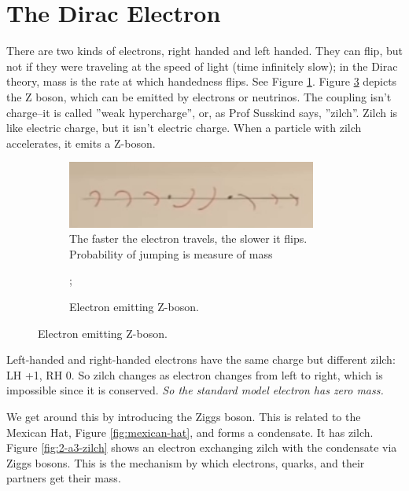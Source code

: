 \documentclass[]{article}
\begin{document}
\section{The Dirac Electron}

There are two kinds of electrons, right handed and left handed. They can flip, but not if they were traveling at the speed of light (time infinitely slow); in the Dirac theory, mass is the rate at which handedness flips. See Figure \ref{fig:2-a3-flipping-electron}. Figure \ref{fig:2-a3-Z-boson} depicts the Z boson, which can be emitted by electrons or neutrinos. The coupling isn't charge--it is called ''weak hypercharge'', or, as Prof Susskind says, ''zilch''. Zilch is like electric charge, but it isn't electric charge. When a particle with zilch accelerates, it emits a Z-boson.

\begin{figure}[H]
	\caption{Electron flipping between left and right}
	\begin{subfigure}[t]{0.65\textwidth}
		\caption{The faster the electron travels, the slower it flips. Probability of jumping is measure of mass}\label{fig:2-a3-flipping-electron}
		\includegraphics[width=0.9\textwidth]{2-a3-flipping-electron}
	\end{subfigure}
	\hfill
	\begin{subfigure}[t]{0.3\textwidth}
		\caption{Electron emitting Z-boson. }\label{fig:2-a3-Z-boson}
		;
	\end{subfigure}	
\end{figure} 


Left-handed and right-handed electrons have the same charge but different zilch: LH +1, RH 0. So zilch changes as electron changes from left to right, which is impossible since it is conserved. \emph{So the standard model electron has zero mass.}

We get around this by introducing the Ziggs boson. This is related to the Mexican Hat, Figure \ref{fig:mexican-hat}, and forms a condensate. It has zilch. Figure \ref{fig:2-a3-zilch} shows an electron exchanging zilch with the condensate via Ziggs bosons. This is the mechanism by which electrons, quarks, and their partners get their mass.
\end{document}
